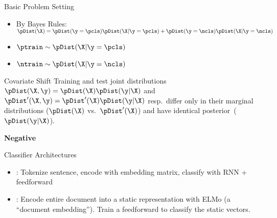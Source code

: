 \begin{frame}
  \titlepage
\end{frame}

\begin{frame}{Basic Problem Setting}
  \vfill
  \begin{itemize}[<+->]
    \item By Bayes Rules: ${\pDist(\X) = \pDist(\y = \pcls) \pDist(\X \vert \y = \pcls) + \pDist(\y = \ncls) \pDist(\X \vert \y = \ncls)}$
  \end{itemize}
  \vfill
  \begin{itemize}[<+->]
    \item ${\ptrain \sim \pDist(\X \vert \y = \pcls)}$
    \item ${\ntrain \sim \pDist(\X \vert \y = \ncls)}$
  \end{itemize}
\end{frame}

\begin{frame}{}
  \begin{block}{Covariate Shift}
     Training and test joint distributions ${\pDist(\X,\y) = \pDist(\X)\pDist(\y \vert \X)}$ and ${\pDist'(\X,\y)= \pDist'(\X)\pDist(\y \vert \X)}$ resp.\ differ only in their marginal distributions (${\pDist(\X)}$ vs.\ ${\pDist'(\X)}$) and have identical posterior~(${\pDist(\y \vert \X)}$).
  \end{block}
  \vfill
  \textbf{Negative}
\end{frame}

\begin{frame}{Classifier Architectures}
  \vfill
  \begin{itemize}[<+->]
    \setlength{\itemsep}{24pt}
    \item {}: Tokenize sentence, encode with embedding matrix, classify with RNN + feedforward

    \item {}: Encode entire document into a static representation with ELMo (a ``document embedding'').  Train a feedforward to classify the static vectors.
  \end{itemize}
  \vfill
\end{frame}

